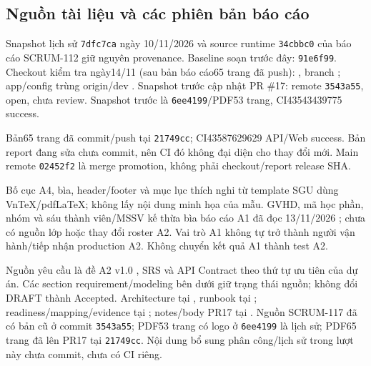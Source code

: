 \clearpage
\subsection{Nguồn tài liệu và các phiên bản báo cáo}
\label{sec:report-provenance}
Snapshot lịch sử \texttt{7dfc7ca} ngày 10/11/2026 và source runtime
\texttt{34cbbc0} của báo cáo SCRUM-112 giữ nguyên provenance. Baseline soạn trước đây: \texttt{91e6f99}. Checkout kiểm tra ngày14/11 (sau bản báo cáo65 trang đã push):
, branch
; app/config trùng origin/dev
.
Snapshot trước cập nhật PR \#17: remote \texttt{3543a55}, open, chưa review.
Snapshot trước là \texttt{6ee4199}/PDF53 trang, CI43543439775 success.\par
Bản65 trang đã commit/push tại \texttt{21749cc}; CI43587629629 API/Web success.
Bản report đang sửa chưa commit, nên CI đó không đại diện cho thay đổi mới.
Main remote \texttt{02452f2} là merge promotion, không phải checkout/report release SHA.

Bố cục A4, bìa, header/footer và mục lục thích nghi từ template SGU dùng
VnTeX/pdfLaTeX; không lấy nội dung minh họa của mẫu. GVHD, mã học phần, nhóm
và sáu thành viên/MSSV kế thừa bìa báo cáo A1 đã đọc 13/11/2026 \cite{a1report};
chưa có nguồn lớp hoặc thay đổi roster A2. Vai trò A1 không tự trở thành
người vận hành/tiếp nhận production A2. Không chuyển kết quả A1 thành test A2.

Nguồn yêu cầu là đề A2 v1.0 \cite{a2brief}, SRS và API Contract theo thứ tự
ưu tiên của dự án. Các section requirement/modeling bên dưới giữ trạng thái
nguồn; không đổi DRAFT thành Accepted. Architecture tại ,
runbook tại ; readiness/mapping/evidence tại
; notes/body PR17 tại
. Nguồn SCRUM-117 đã có bản cũ ở commit
\texttt{3543a55}; PDF53 trang có logo ở \texttt{6ee4199} là lịch sử; PDF65 trang đã lên PR17 tại
\texttt{21749cc}. Nội dung bổ sung phân công/lịch sử trong lượt này chưa commit, chưa có CI riêng.




